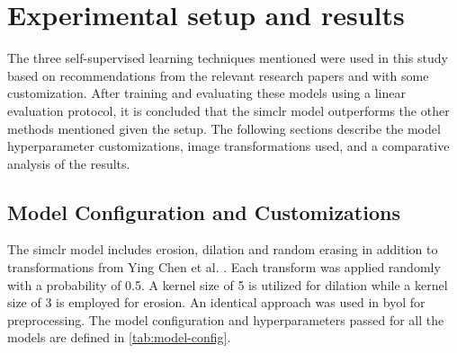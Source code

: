 \chapter{Experimental setup and results}

The three self-supervised learning techniques mentioned were used in this study based on recommendations from the relevant research papers and with some customization. After training and evaluating these models using a linear evaluation protocol, it is concluded that the \gls{simclr} model outperforms the other methods mentioned given the setup. The following sections describe the model hyperparameter customizations, image transformations used, and a comparative analysis of the results.

\section{Model Configuration and Customizations}

The \gls{simclr} model includes erosion, dilation and random erasing in addition to transformations from Ying Chen et al. \cite{chen_simple_2020}. Each transform was applied randomly with a probability of 0.5. A kernel size of 5 is utilized for dilation while a kernel size of 3 is employed for erosion. An identical approach was used in \gls{byol} for preprocessing. The model configuration and hyperparameters passed for all the models are defined in \cref{tab:model-config}.

